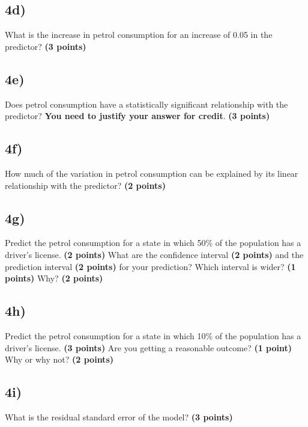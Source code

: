 \documentclass[
  letterpaper,
  DIV=11,
  numbers=noendperiod]{scrreprt}
\begin{document}
\subsection{4d)}\label{d-1}

What is the increase in petrol consumption for an increase of 0.05 in
the predictor? \textbf{(3 points)}

\subsection{4e)}\label{e}

Does petrol consumption have a statistically significant relationship
with the predictor? \textbf{You need to justify your answer for credit}.
\textbf{(3 points)}

\subsection{4f)}\label{f}

How much of the variation in petrol consumption can be explained by its
linear relationship with the predictor? \textbf{(2 points)}

\subsection{4g)}\label{g}

Predict the petrol consumption for a state in which 50\% of the
population has a driver's license. \textbf{(2 points)} What are the
confidence interval \textbf{(2 points)} and the prediction interval
\textbf{(2 points)} for your prediction? Which interval is wider?
\textbf{(1 points)} Why? \textbf{(2 points)}

\subsection{4h)}\label{h}

Predict the petrol consumption for a state in which 10\% of the
population has a driver's license. \textbf{(3 points)} Are you getting a
reasonable outcome? \textbf{(1 point)} Why or why not? \textbf{(2
points)}

\subsection{4i)}\label{i}

What is the residual standard error of the model? \textbf{(3 points)}
\end{document}
